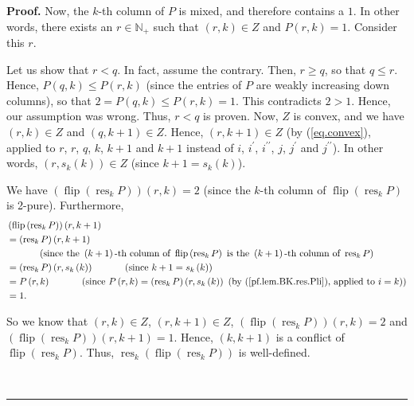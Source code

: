 \documentclass[numbers=enddot,12pt,final,onecolumn,notitlepage]{scrartcl}%
\theoremstyle{definition}
\newenvironment{proof}[1][Proof]{\noindent\textbf{#1.} }{\ \rule{0.5em}{0.5em}}
\newenvironment{verlong}{}{}
\begin{document}
\begin{verlong}
\begin{proof}
Now, the $k$-th column of $P$ is mixed, and therefore contains a $1$. In other
words, there exists an $r\in\mathbb{N}_{+}$ such that $\left(  r,k\right)  \in
Z$ and $P\left(  r,k\right)  =1$. Consider this $r$.

Let us show that $r<q$. In fact, assume the contrary. Then, $r\geq q$, so that
$q\leq r$. Hence, $P\left(  q,k\right)  \leq P\left(  r,k\right)  $ (since the
entries of $P$ are weakly increasing down columns), so that $2=P\left(
q,k\right)  \leq P\left(  r,k\right)  =1$. This contradicts $2>1$. Hence, our
assumption was wrong. Thus, $r<q$ is proven. Now, $Z$ is convex, and we have
$\left(  r,k\right)  \in Z$ and $\left(  q,k+1\right)  \in Z$. Hence, $\left(
r,k+1\right)  \in Z$ (by (\ref{eq.convex}), applied to $r$, $r$, $q$, $k$,
$k+1$ and $k+1$ instead of $i$, $i^{\prime}$, $i^{\prime\prime}$, $j$,
$j^{\prime}$ and $j^{\prime\prime}$). In other words, $\left(  r,s_{k}\left(
k\right)  \right)  \in Z$ (since $k+1=s_{k}\left(  k\right)  $).

We have $\left(  \operatorname*{flip}\left(  \operatorname*{res}%
\nolimits_{k}P\right)  \right)  \left(  r,k\right)  =2$ (since the $k$-th
column of $\operatorname*{flip}\left(  \operatorname*{res}\nolimits_{k}%
P\right)  $ is 2-pure). Furthermore,
\begin{align*}
&  \left(  \operatorname*{flip}\left(  \operatorname*{res}\nolimits_{k}%
P\right)  \right)  \left(  r,k+1\right) \\
&  =\left(  \operatorname*{res}\nolimits_{k}P\right)  \left(  r,k+1\right) \\
&  \ \ \ \ \ \ \ \ \ \ \left(  \text{since the }\left(  k+1\right)  \text{-th
column of }\operatorname*{flip}\left(  \operatorname*{res}\nolimits_{k}%
P\right)  \text{ is the }\left(  k+1\right)  \text{-th column of
}\operatorname*{res}\nolimits_{k}P\right) \\
&  =\left(  \operatorname*{res}\nolimits_{k}P\right)  \left(  r,s_{k}\left(
k\right)  \right)  \ \ \ \ \ \ \ \ \ \ \left(  \text{since }k+1=s_{k}\left(
k\right)  \right) \\
&  =P\left(  r,k\right)  \ \ \ \ \ \ \ \ \ \ \left(  \text{since }P\left(
r,k\right)  =\left(  \operatorname*{res}\nolimits_{k}P\right)  \left(
r,s_{k}\left(  k\right)  \right)  \text{ (by (\ref{pf.lem.BK.res.Pli}),
applied to }i=k\text{)}\right) \\
&  =1.
\end{align*}


So we know that $\left(  r,k\right)  \in Z$, $\left(  r,k+1\right)  \in Z$,
$\left(  \operatorname*{flip}\left(  \operatorname*{res}\nolimits_{k}P\right)
\right)  \left(  r,k\right)  =2$ and $\left(  \operatorname*{flip}\left(
\operatorname*{res}\nolimits_{k}P\right)  \right)  \left(  r,k+1\right)  =1$.
Hence, $\left(  k,k+1\right)  $ is a conflict of $\operatorname*{flip}\left(
\operatorname*{res}\nolimits_{k}P\right)  $. Thus, $\operatorname*{res}%
\nolimits_{k}\left(  \operatorname*{flip}\left(  \operatorname*{res}%
\nolimits_{k}P\right)  \right)  $ is well-defined.


\end{proof}
\end{verlong}
\end{document}
